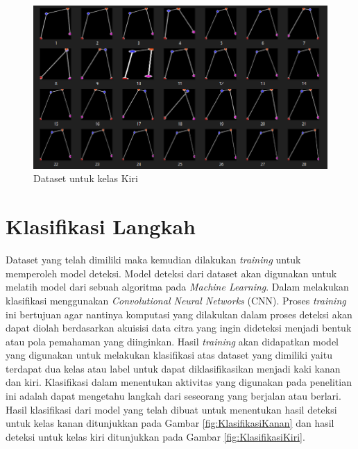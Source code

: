 \begin{figure}[H]
  \centering
  \includegraphics[scale=0.45]{gambar/folder dataset kiri.png}
  \caption{Dataset untuk kelas Kiri}
  \label{fig:DatasetKiri}
\end{figure}


\section{Klasifikasi Langkah}
\label{sec:KlasifikasiLangkah}

Dataset yang telah dimiliki maka kemudian dilakukan \emph{training} untuk memperoleh model deteksi. Model deteksi dari dataset akan digunakan untuk melatih model dari sebuah algoritma pada \emph{Machine Learning}. Dalam melakukan klasifikasi menggunakan \emph{Convolutional Neural Networks} (CNN). Proses \emph{training} ini bertujuan agar nantinya komputasi yang dilakukan dalam proses deteksi akan dapat diolah berdasarkan akuisisi data citra yang ingin dideteksi menjadi bentuk atau pola pemahaman yang diinginkan. Hasil \emph{training} akan didapatkan model yang digunakan untuk melakukan klasifikasi atas dataset yang dimiliki yaitu terdapat dua kelas atau label untuk dapat diklasifikasikan menjadi kaki kanan dan kiri. Klasifikasi dalam menentukan aktivitas yang digunakan pada penelitian ini adalah dapat mengetahu langkah dari seseorang yang berjalan atau berlari. Hasil klasifikasi dari model yang telah dibuat untuk menentukan hasil deteksi untuk kelas kanan ditunjukkan pada Gambar \ref{fig:KlasifikasiKanan} dan hasil deteksi untuk kelas kiri ditunjukkan pada Gambar \ref{fig:KlasifikasiKiri}.


